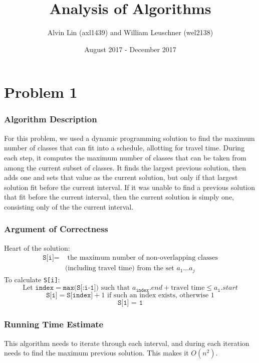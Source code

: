 \documentclass[letterpaper, 12pt]{math}
\title{Analysis of Algorithms}
\author{Alvin Lin (axl1439) and William Leuschner (wel2138)}
\date{August 2017 - December 2017}
\begin{document}
\maketitle

\section*{Problem 1}

\subsubsection*{Algorithm Description}
For this problem, we used a dynamic programming solution to find the maximum
number of classes that can fit into a schedule, allotting for travel time.
During each step, it computes the maximum number of classes that can be taken
from among the current subset of classes. It finds the largest previous
solution, then adds one and sets that value as the current solution, but only
if that largest solution fit before the current interval. If it was unable to
find a previous solution that fit before the current interval, then the current
solution is simply one, consisting only of the the current interval.

\subsubsection*{Argument of Correctness}
Heart of the solution:
\begin{align*}
  \texttt{S[i]} =& \text{ the maximum number of non-overlapping classes} \\
  & \text{(including travel time) from the set } a_{1}\dots a_{j}
\end{align*}
To calculate \texttt{S[i]}:
\[ \text{Let } \texttt{index} = \texttt{max(S[:i-1])} \text{ such that }
  a_{\texttt{index}}.end + \text{travel time} \le a_{\texttt{i}}.start \]
\[ \texttt{S[i]} = \texttt{S[index]} + 1 \text{ if such an index exists,
  otherwise } 1 \]
\[ \texttt{S[1] = 1} \]

\subsubsection*{Running Time Estimate}
This algorithm needs to iterate through each interval, and during each
iteration needs to find the maximum previous solution. This makes it
\( O(n^2) \).
\end{document}
